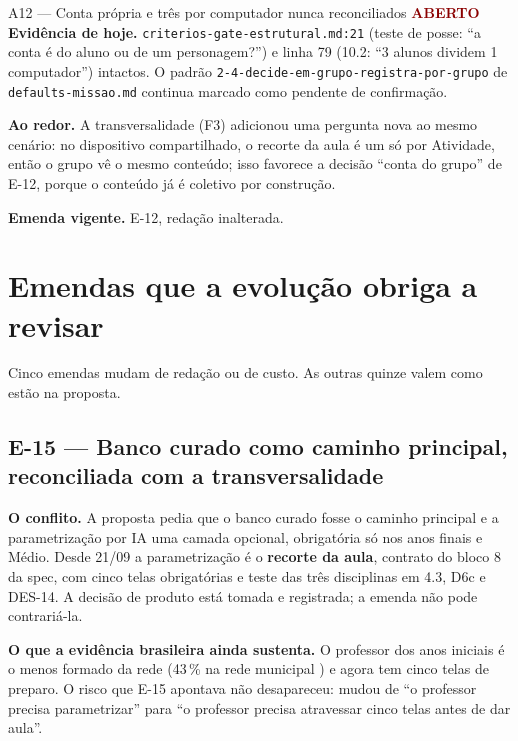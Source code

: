 \documentclass[11pt,a4paper]{article}
\newcommand{\aberto}{\textcolor{DarkRed}{\textbf{ABERTO}}}
\begin{document}
\begin{achadobox}{A12 --- Conta própria e três por computador nunca reconciliados \hfill \aberto}
\textbf{Evidência de hoje.} \texttt{criterios-gate-estrutural.md:21} (teste de posse: ``a conta é do
aluno ou de um personagem?'') e linha 79 (10.2: ``3 alunos dividem 1 computador'') intactos. O
padrão \texttt{2-4-decide-em-grupo-registra-por-grupo} de \texttt{defaults-missao.md} continua
marcado como pendente de confirmação.

\textbf{Ao redor.} A transversalidade (F3) adicionou uma pergunta nova ao mesmo cenário: no
dispositivo compartilhado, o recorte da aula é um só por Atividade, então o grupo vê o mesmo
conteúdo; isso favorece a decisão ``conta do grupo'' de E-12, porque o conteúdo já é coletivo por
construção.

\textbf{Emenda vigente.} E-12, redação inalterada.
\end{achadobox}

\section{Emendas que a evolução obriga a revisar}

Cinco emendas mudam de redação ou de custo. As outras quinze valem como estão na proposta.

\subsection{E-15 --- Banco curado como caminho principal, reconciliada com a transversalidade}
\label{sec:e15}

\textbf{O conflito.} A proposta pedia que o banco curado fosse o caminho principal e a
parametrização por IA uma camada opcional, obrigatória só nos anos finais e Médio. Desde 21/09 a
parametrização é o \textbf{recorte da aula}, contrato do bloco 8 da spec, com cinco telas
obrigatórias e teste das três disciplinas em 4.3, D6c e DES-14. A decisão de produto está tomada e
registrada; a emenda não pode contrariá-la.

\textbf{O que a evidência brasileira ainda sustenta.} O professor dos anos iniciais é o menos
formado da rede (43\,\% na rede municipal \cite{ticedu2024}) e agora tem cinco telas de preparo. O
risco que E-15 apontava não desapareceu: mudou de ``o professor precisa parametrizar'' para ``o
professor precisa atravessar cinco telas antes de dar aula''.
\end{document}
